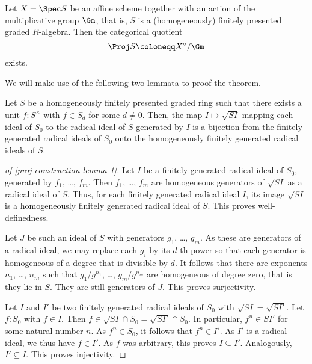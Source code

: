 \begin{theorem}\label{proj construction}
  Let $X = \Spec S$ be an affine scheme together with an action of the
  multiplicative group $\Gm$, that is, $S$ is a (homogeneously)
  finitely presented graded $R$-algebra.  Then the categorical
  quotient
  \begin{equation*}
    \Proj S \coloneqq X^\circ/\Gm
  \end{equation*}
  exists.
\end{theorem}

We will make use of the following two lemmata to proof the theorem.

\begin{lemma}\label{proj construction lemma 1}
  Let $S$ be a homogeneously finitely presented graded ring such that
  there exists a unit $f\colon S^\times$ with $f \in S_d$ for some $d \neq
  0$.  Then, the map $I \mapsto \sqrt{SI}$ mapping each ideal of $S_0$
  to the radical ideal of $S$ generated by $I$ is a bijection from
  the finitely generated radical ideals of $S_0$ onto the homogeneously finitely
  generated radical ideals of $S$.
\end{lemma}

\begin{proof}[of \cref{proj construction lemma 1}]
  Let $I$ be a finitely generated radical ideal of $S_0$, generated by
  $f_1$, \dots, $f_m$.  Then $f_1$, \dots, $f_m$ are homogeneous generators of
  $\sqrt{SI}$ as a radical ideal of $S$.  Thus, for each finitely generated
  radical ideal $I$, its image $\sqrt{SI}$ is a homogeneously finitely
  generated radical ideal of $S$.  This proves well-definedness.

  Let $J$ be such an ideal of $S$ with
  generators $g_1$, \dots, $g_m$.  As these are generators of a
  radical ideal, we may replace each $g_i$ by its $d$-th power so that
  each generator is homogeneous of a degree that is divisible by $d$.
  It follows that there are exponents $n_1$, \dots, $n_m$ such that
  $g_1/g^{n_1}$, \dots, $g_m/g^{n_m}$ are homogeneous of degree zero,
  that is they lie in $S$.  They are still generators of $J$.  This
  proves surjectivity.

  Let $I$ and $I'$ be two finitely generated radical ideals of $S_0$
  with $\sqrt{SI} = \sqrt{SI'}$.  Let $f\colon S_0$ with $f \in I$.  Then $f \in \sqrt{SI}
  \cap S_0 = \sqrt{SI'} \cap S_0$.  In particular, $f^n \in SI'$ for
  some natural number $n$.  As $f^n \in S_0$, it follows that $f^n \in
  I'$.  As $I'$ is a radical ideal, we thus have $f \in I'$.  As $f$
  was arbitrary, this proves $I \subseteq I'$.  Analogously, $I'
  \subseteq I$.  This proves injectivity.
\end{proof}

